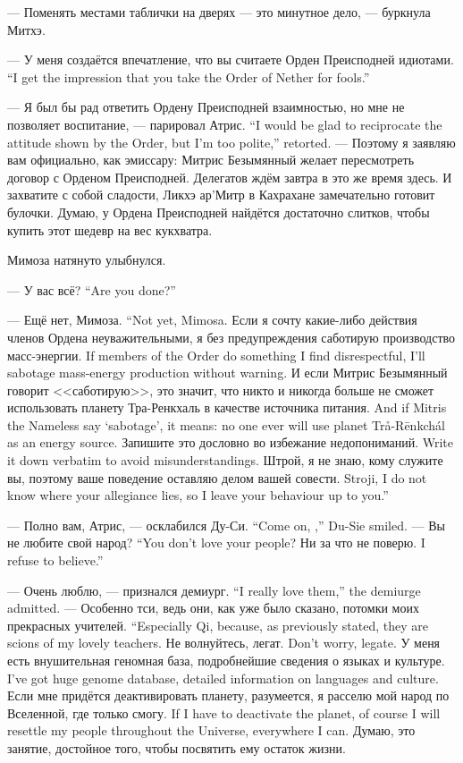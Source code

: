 --- Поменять местами таблички на дверях --- это минутное дело, --- буркнула Митхэ.

{--- У меня создаётся впечатление, что вы считаете Орден Преисподней идиотами.}
{``I get the impression that you take the Order of Nether for fools.''}

{--- Я был бы рад ответить Ордену Преисподней взаимностью, но мне не позволяет воспитание, --- парировал Атрис.}
{``I would be glad to reciprocate the attitude shown by the Order, but I'm too polite,'' \Aatris{} retorted.}
--- Поэтому я заявляю вам официально, как эмиссару: Митрис Безымянный желает пересмотреть договор с Орденом Преисподней.
Делегатов ждём завтра в это же время здесь.
И захватите с собой сладости, Ликхэ ар'Митр в Кахрахане замечательно готовит булочки.
Думаю, у Ордена Преисподней найдётся достаточно слитков, чтобы купить этот шедевр на вес кукхватра.

Мимоза натянуто улыбнулся.

{--- У вас всё?}
{``Are you done?''}

{--- Ещё нет, Мимоза.}
{``Not yet, Mimosa.}
{Если я сочту какие-либо действия членов Ордена неуважительными, я без предупреждения саботирую производство масс-энергии.}
{If members of the Order do something I find disrespectful, I'll sabotage mass-energy production without warning.}
{И если Митрис Безымянный говорит <<саботирую>>, это значит, что никто и никогда больше не сможет использовать планету Тра-Ренкхаль в качестве источника питания.}
{And if Mitris the Nameless say `sabotage', it means: no one ever will use planet Tr\r{a}-R\={e}nkch\'{a}l as an energy source.}
{Запишите это дословно во избежание недопониманий.}
{Write it down verbatim to avoid misunderstandings.}
{Штрой, я не знаю, кому служите вы, поэтому ваше поведение оставляю делом вашей совести.}
{Stroji, I do not know where your allegiance lies, so I leave your behaviour up to you.''}

{--- Полно вам, Атрис, --- осклабился Ду-Си.}
{``Come on, \Aatris{},'' Du-Sie smiled.}
{--- Вы не любите свой народ?}
{``You don't love your people?}
{Ни за что не поверю.}
{I refuse to believe.''}

{--- Очень люблю, --- признался демиург.}
{``I really love them,'' the demiurge admitted.}
{--- Особенно тси, ведь они, как уже было сказано, потомки моих прекрасных учителей.}
{``Especially Qi, because, as previously stated, they are scions of my lovely teachers.}
{Не волнуйтесь, легат.}
{Don't worry, legate.}
{У меня есть внушительная геномная база, подробнейшие сведения о языках и культуре.}
{I've got huge genome database, detailed information on languages and culture.}
{Если мне придётся деактивировать планету, разумеется, я расселю мой народ по Вселенной, где только смогу.}
{If I have to deactivate the planet, of course I will resettle my people throughout the Universe, everywhere I can.}
Думаю, это занятие, достойное того, чтобы посвятить ему остаток жизни.

